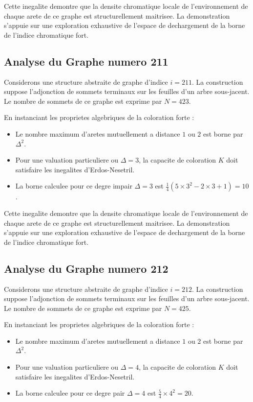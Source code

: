 \documentclass[11pt,a4paper]{article}
\begin{document}
Cette inegalite demontre que la densite chromatique locale de l'environnement de chaque arete de ce graphe est structurellement maitrisee. La demonstration s'appuie sur une exploration exhaustive de l'espace de dechargement de la borne de l'indice chromatique fort.

\subsection{Analyse du Graphe numero 211}
Considerons une structure abstraite de graphe d'indice $i = 211$. La construction suppose l'adjonction de sommets terminaux sur les feuilles d'un arbre sous-jacent. Le nombre de sommets de ce graphe est exprime par $N = 423$.

En instanciant les proprietes algebriques de la coloration forte :
\begin{itemize}
\item Le nombre maximum d'aretes mutuellement a distance $1$ ou $2$ est borne par $\Delta^2$.
\item Pour une valuation particuliere ou $\Delta = 3$, la capacite de coloration $K$ doit satisfaire les inegalites d'Erdos-Nesetril.
\item La borne calculee pour ce degre impair $\Delta = 3$ est $\frac{1}{4}(5 \times 3^2 - 2 \times 3 + 1) = 10$.
\end{itemize}

Cette inegalite demontre que la densite chromatique locale de l'environnement de chaque arete de ce graphe est structurellement maitrisee. La demonstration s'appuie sur une exploration exhaustive de l'espace de dechargement de la borne de l'indice chromatique fort.

\subsection{Analyse du Graphe numero 212}
Considerons une structure abstraite de graphe d'indice $i = 212$. La construction suppose l'adjonction de sommets terminaux sur les feuilles d'un arbre sous-jacent. Le nombre de sommets de ce graphe est exprime par $N = 425$.

En instanciant les proprietes algebriques de la coloration forte :
\begin{itemize}
\item Le nombre maximum d'aretes mutuellement a distance $1$ ou $2$ est borne par $\Delta^2$.
\item Pour une valuation particuliere ou $\Delta = 4$, la capacite de coloration $K$ doit satisfaire les inegalites d'Erdos-Nesetril.
\item La borne calculee pour ce degre pair $\Delta = 4$ est $\frac{5}{4} \times 4^2 = 20$.
\end{itemize}
\end{document}
